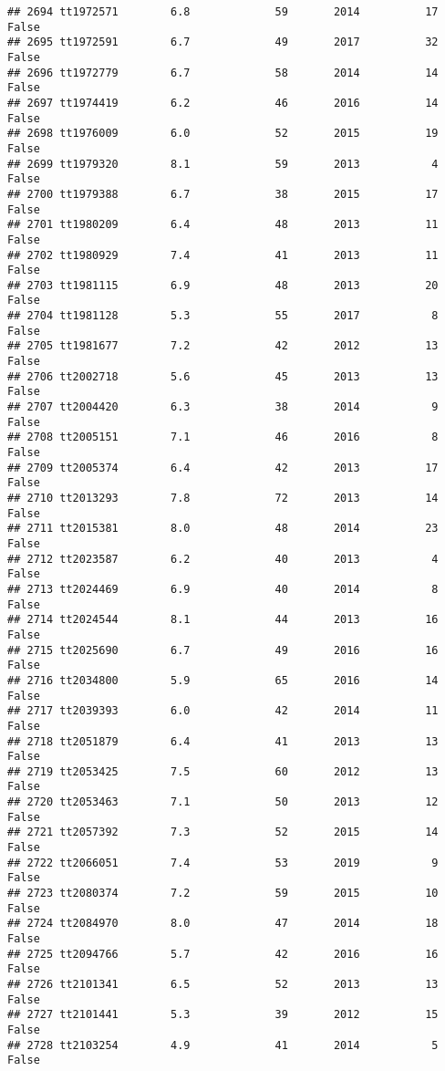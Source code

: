 \documentclass[
]{article}
\begin{document}
\begin{verbatim}
## 2694 tt1972571        6.8             59       2014          17   False
## 2695 tt1972591        6.7             49       2017          32   False
## 2696 tt1972779        6.7             58       2014          14   False
## 2697 tt1974419        6.2             46       2016          14   False
## 2698 tt1976009        6.0             52       2015          19   False
## 2699 tt1979320        8.1             59       2013           4   False
## 2700 tt1979388        6.7             38       2015          17   False
## 2701 tt1980209        6.4             48       2013          11   False
## 2702 tt1980929        7.4             41       2013          11   False
## 2703 tt1981115        6.9             48       2013          20   False
## 2704 tt1981128        5.3             55       2017           8   False
## 2705 tt1981677        7.2             42       2012          13   False
## 2706 tt2002718        5.6             45       2013          13   False
## 2707 tt2004420        6.3             38       2014           9   False
## 2708 tt2005151        7.1             46       2016           8   False
## 2709 tt2005374        6.4             42       2013          17   False
## 2710 tt2013293        7.8             72       2013          14   False
## 2711 tt2015381        8.0             48       2014          23   False
## 2712 tt2023587        6.2             40       2013           4   False
## 2713 tt2024469        6.9             40       2014           8   False
## 2714 tt2024544        8.1             44       2013          16   False
## 2715 tt2025690        6.7             49       2016          16   False
## 2716 tt2034800        5.9             65       2016          14   False
## 2717 tt2039393        6.0             42       2014          11   False
## 2718 tt2051879        6.4             41       2013          13   False
## 2719 tt2053425        7.5             60       2012          13   False
## 2720 tt2053463        7.1             50       2013          12   False
## 2721 tt2057392        7.3             52       2015          14   False
## 2722 tt2066051        7.4             53       2019           9   False
## 2723 tt2080374        7.2             59       2015          10   False
## 2724 tt2084970        8.0             47       2014          18   False
## 2725 tt2094766        5.7             42       2016          16   False
## 2726 tt2101341        6.5             52       2013          13   False
## 2727 tt2101441        5.3             39       2012          15   False
## 2728 tt2103254        4.9             41       2014           5   False

\end{verbatim}
\end{document}
